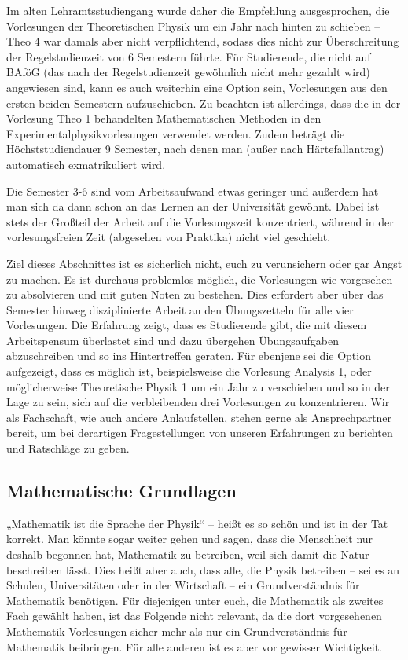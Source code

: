 Im alten Lehramtsstudiengang wurde daher die Empfehlung ausgesprochen, die
Vorlesungen der Theoretischen Physik um ein Jahr nach hinten zu schieben --
Theo 4 war damals aber nicht verpflichtend, sodass dies nicht zur
Überschreitung der Regelstudienzeit von 6 Semestern führte. Für Studierende,
die nicht auf BAföG (das nach der Regelstudienzeit gewöhnlich nicht mehr
gezahlt wird) angewiesen sind, kann es auch weiterhin eine Option sein,
Vorlesungen aus den ersten beiden Semestern aufzuschieben. Zu beachten ist
allerdings, dass die in der Vorlesung Theo 1 behandelten Mathematischen
Methoden in den Experimentalphysikvorlesungen verwendet werden. Zudem
beträgt die Höchststudiendauer 9 Semester, nach denen man (außer nach
Härtefallantrag) automatisch exmatrikuliert wird.

Die Semester 3-6 sind vom Arbeitsaufwand etwas geringer und außerdem hat man
sich da dann schon an das Lernen an der Universität gewöhnt. Dabei ist stets
der Großteil der Arbeit auf die Vorlesungszeit konzentriert, während in der
vorlesungsfreien Zeit (abgesehen von Praktika) nicht viel geschieht.

Ziel dieses Abschnittes ist es sicherlich nicht, euch zu verunsichern oder
gar Angst zu machen. Es ist durchaus problemlos möglich, die Vorlesungen wie
vorgesehen zu absolvieren und mit guten Noten zu bestehen. Dies erfordert
aber über das Semester hinweg disziplinierte Arbeit an den Übungszetteln für
alle vier Vorlesungen. Die Erfahrung zeigt, dass es Studierende gibt, die
mit diesem Arbeitspensum überlastet sind und dazu übergehen Übungsaufgaben
abzuschreiben und so ins Hintertreffen geraten. Für ebenjene sei die Option
aufgezeigt, dass es möglich ist, beispielsweise die Vorlesung Analysis 1,
oder möglicherweise Theoretische Physik 1 um ein Jahr zu verschieben und so
in der Lage zu sein, sich auf die verbleibenden drei Vorlesungen zu
konzentrieren. Wir als Fachschaft, wie auch andere Anlaufstellen, stehen
gerne als Ansprechpartner bereit, um bei derartigen Fragestellungen von
unseren Erfahrungen zu berichten und Ratschläge zu geben.


\subsection{Mathematische Grundlagen}

„Mathematik ist die Sprache der Physik“ -- heißt es so schön und ist in der
Tat korrekt. Man könnte sogar weiter gehen und sagen, dass die Menschheit
nur deshalb begonnen hat, Mathematik zu betreiben, weil sich damit die Natur
beschreiben lässt. Dies heißt aber auch, dass alle, die Physik betreiben --
sei es an Schulen, Universitäten oder in der Wirtschaft -- ein
Grundverständnis für Mathematik benötigen. Für diejenigen unter euch, die
Mathematik als zweites Fach gewählt haben, ist das Folgende nicht relevant,
da die dort vorgesehenen Mathematik-Vorlesungen sicher mehr als nur ein
Grundverständnis für Mathematik beibringen. Für alle anderen ist es aber vor
gewisser Wichtigkeit.

